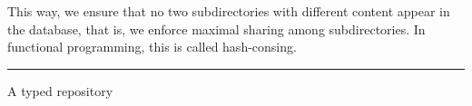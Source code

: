 \documentclass[ignorenonframetext,red]{beamer}
\begin{document}
This way, we ensure that no two subdirectories with different content
appear in the database, that is, we enforce maximal sharing among
subdirectories. In functional programming, this is called
hash-consing.

\hrule
\begin{frame}{A typed repository}

\end{frame}
\end{document}
